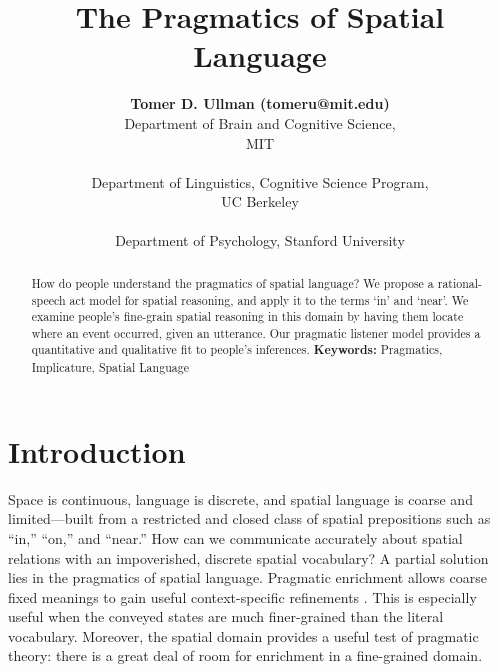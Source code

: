 \documentclass[10pt,letterpaper]{article}
\title{The Pragmatics of Spatial Language}
\author{
{\large \bf Tomer D. Ullman (tomeru@mit.edu)} \\
  Department of Brain and Cognitive Science, \\MIT\\
  \And{\large \bf Yang Xu (yang\_xu\_ch@berkeley.edu)} \\
  Department of Linguistics, Cognitive Science Program, \\UC Berkeley \\
 \AND{\large \bf Noah D. Goodman (ngoodman@stanford.edu)} \\
  Department of Psychology, Stanford University\\
}
\newcommand{\ndg}[1]{\textcolor{Green}{[ndg: #1]}}
\begin{document}
\maketitle

\begin{abstract}

How do people understand the pragmatics of spatial language? 
We propose a rational-speech act model for spatial reasoning, and apply it to the terms `in' and `near'. We examine people's fine-grain spatial reasoning in this domain by having them locate where an event occurred, given an utterance. Our pragmatic listener model provides a quantitative and qualitative fit to people's inferences. \textbf{Keywords:}
Pragmatics, Implicature, Spatial Language

\end{abstract}

\section{Introduction} 
Space is continuous, language is discrete, and spatial language is coarse and limited---built from a restricted and closed class of spatial prepositions \cite{talmy83,talmy00,landau93} such as ``in,'' ``on,'' and ``near.'' 
How can we communicate accurately about spatial relations with an impoverished, discrete spatial vocabulary?
A partial solution lies in the pragmatics of spatial language.
Pragmatic enrichment allows coarse fixed meanings to gain useful context-specific refinements \cite{grice75,horn84}. This is especially useful when the conveyed states are much finer-grained than the literal vocabulary. Moreover, the spatial domain provides a useful test of pragmatic theory: there is a great deal of room for enrichment in a fine-grained domain.
%
\end{document}
